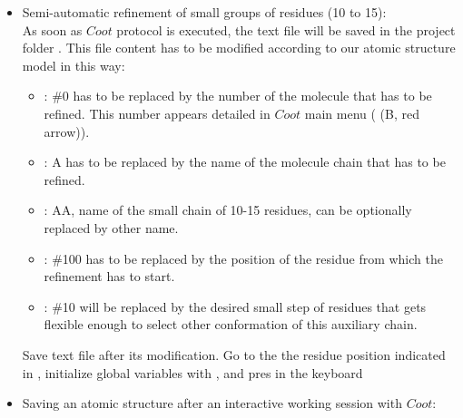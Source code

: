 \begin{itemize}
\begin{itemize}
\begin{itemize}
\begin{itemize}
     \end{itemize} 
     \item Semi-automatic refinement of small groups of residues (10 to 15):\\As soon as $Coot$ protocol is executed, the text file  will be saved in the project folder . This file content has to be modified according to our atomic structure model in this way:\\
     \begin{itemize}
      \item {}: \#0 has to be replaced by the number of the molecule that has to be refined. This number appears detailed in $Coot$ main menu  ( (B, red arrow)).
      \item {}: A has to be replaced by the name of the molecule chain that has to be refined.\\
      \item {}: AA, name of the small chain of 10-15 residues, can be optionally replaced by other name.\\
      \item {}: \#100 has to be replaced by the position of the residue from which the refinement has to start.\\
      \item {}: \#10 will be replaced by the desired small step of residues that gets flexible enough to select other conformation of this auxiliary chain.\\ 
     \end{itemize} 
     Save  text file after its modification. Go to the the residue position indicated in , initialize global variables with , and pres  in the keyboard
     \item Saving an atomic structure after an interactive working session with $Coot$:\\

\end{itemize}
\end{itemize}
\end{itemize}
